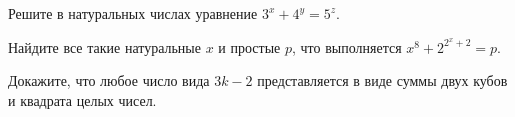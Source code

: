 \begin{problem}[3<sup>x</sup> + 4<sup>y</sup> = 5<sup>z</sup>]
	Решите в натуральных числах уравнение $3^x + 4^y = 5^z$.
\end{problem}

\begin{problem}[x<sup>8</sup> + 2<sup>2<sup>x</sup>+2</sup> = p]
	Найдите все такие натуральные $x$ и простые $p$, что выполняется $x^8 + 2^{2^x+2} = p$.
\end{problem}

\begin{problem}
	Докажите, что любое число вида $3k - 2$ представляется в виде суммы двух кубов и квадрата целых чисел.
\end{problem}

